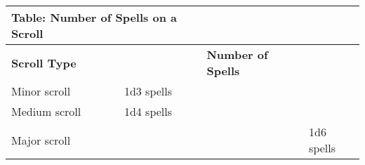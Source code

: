\vspace{12pt}
\begin{longtable}{llll}
\hline
\multicolumn{2}{|p{2.265in}|}{\begin{minipage}[t]{2.265in}\raggedright
\textbf{Table: Number of Spells on a Scroll}\end{minipage}}\\
\hline
\multicolumn{2}{p{0.139in}|}{\begin{minipage}[t]{0.139in}\raggedright
\textbf{Scroll Type}\end{minipage}} & \multicolumn{1}{|p{1.020in}|}{\begin{minipage}[t]{1.020in}\raggedright
\textbf{Number of Spells}\end{minipage}}\\
\hline
\multicolumn{1}{p{1.244in}|}{\begin{minipage}[t]{1.244in}\raggedright
Minor scroll\end{minipage}} & \multicolumn{1}{p{0.069in}|}{\begin{minipage}[t]{0.069in}\raggedright
1d3 spells\end{minipage}}\\
\hline
\multicolumn{1}{p{0.069in}|}{\begin{minipage}[t]{0.069in}\raggedright
Medium scroll\end{minipage}} & \multicolumn{1}{|p{1.020in}|}{\begin{minipage}[t]{1.020in}\raggedright
1d4 spells\end{minipage}}\\
\hline
\multicolumn{3}{p{1.383in}|}{\begin{minipage}[t]{1.383in}\raggedright
Major scroll\end{minipage}} & \multicolumn{1}{p{0.069in}|}{\begin{minipage}[t]{0.069in}\raggedright
1d6 spells\end{minipage}}\\
\hline
\end{longtable}

